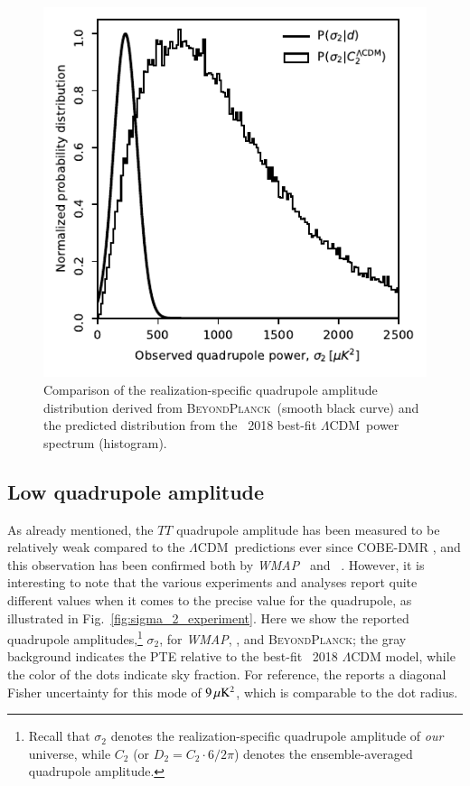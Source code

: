 \documentclass[twocolumn]{aa}
\def\WMAP{\textit{WMAP}}
\def\LCDM{$\Lambda$CDM}
\newcommand{\BP}{\textsc{BeyondPlanck}}
\begin{document}
\begin{figure}[t]
  \includegraphics[width=\linewidth]{figs/P_sig_d_c.pdf}
  \caption{Comparison of the realization-specific quadrupole amplitude
    distribution derived from \BP\ (smooth black curve) and the
    predicted distribution from the \Planck\ 2018 best-fit
    \LCDM\ power spectrum (histogram).}
  \label{fig:P_sig_d_c}
\end{figure}

\subsection{Low quadrupole amplitude}
\label{sec:quadrupole}

As already mentioned, the $TT$ quadrupole amplitude has been measured
to be relatively weak compared to the \LCDM\ predictions ever since
COBE-DMR \citep{bennett:1992}, and this observation has been confirmed
both by \WMAP\ \citep{hinshaw2003b} and
\Planck\ \citep{planck2013-p08}. However, it is interesting to note
that the various experiments and analyses report quite different
values when it comes to the precise value for the quadrupole, as
illustrated in Fig.~\ref{fig:sigma_2_experiment}. Here we show the
reported quadrupole amplitudes,\footnote{Recall that $\sigma_2$ denotes
  the realization-specific quadrupole amplitude of \emph{our}
  universe, while $C_{2}$ (or $D_{2}=C_2 \cdot 6/2\pi$) denotes the ensemble-averaged quadrupole
  amplitude.} $\sigma_2$, for \WMAP, \Planck, and \BP; the gray
background indicates the PTE relative to the best-fit \Planck\ 2018
$\Lambda$CDM model, while the color of the dots indicate sky fraction. For
reference, the \citet{hinshaw2012} reports a diagonal Fisher
uncertainty for this mode of $9\muK^2$, which is comparable to the dot
radius.
\end{document}
